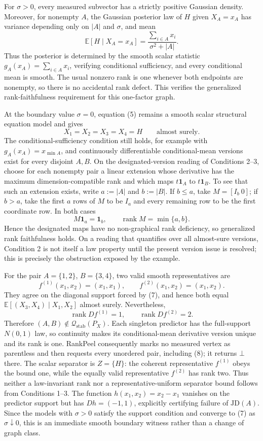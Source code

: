 For \(\sigma>0\), every measured subvector has a strictly positive Gaussian density.  Moreover, for nonempty \(A\), the Gaussian posterior law of \(H\) given \(X_A=x_A\) has variance depending only on \(|A|\) and \(\sigma\), and mean
\[
 \mathbb E[H\mid X_A=x_A]
 =\frac{\sum_{i\in A}x_i}{\sigma^2+|A|}. \tag{6}
\]
Thus the posterior is determined by the smooth scalar statistic \(g_A(x_A)=\sum_{i\in A}x_i\), verifying conditional sufficiency, and every conditional mean is smooth.  The usual nonzero rank is one whenever both endpoints are nonempty, so there is no accidental rank defect.  This verifies the generalized rank-faithfulness requirement for this one-factor graph.

At the boundary value \(\sigma=0\), equation (5) remains a smooth scalar structural equation model and gives
\[
 X_1=X_2=X_3=X_4=H\qquad\text{almost surely}. \tag{7}
\]
The conditional-sufficiency condition still holds, for example with \(g_A(x_A)=x_{\min A}\), and continuously differentiable conditional-mean versions exist for every disjoint \(A,B\).  On the designated-version reading of Conditions 2--3, choose for each nonempty pair a linear extension whose derivative has the maximum dimension-compatible rank and which maps \(t\mathbf 1_A\) to \(t\mathbf 1_B\).  To see that such an extension exists, write \(a:=|A|\) and \(b:=|B|\).  If \(b\leq a\), take \(M=[I_b\ 0]\); if \(b>a\), take the first \(a\) rows of \(M\) to be \(I_a\) and every remaining row to be the first coordinate row.  In both cases
\[
 M\mathbf 1_a=\mathbf 1_b,
 \qquad
 \operatorname{rank}M=\min\{a,b\}. \tag{7a}
\]
Hence the designated maps have no non-graphical rank deficiency, so generalized rank faithfulness holds.  On a reading that quantifies over all almost-sure versions, Condition 2 is not itself a law property until the present version issue is resolved; this is precisely the obstruction exposed by the example.

For the pair \(A=\{1,2\}\), \(B=\{3,4\}\), two valid smooth representatives are
\[
 f^{(1)}(x_1,x_2)=(x_1,x_1),
 \qquad
 f^{(2)}(x_1,x_2)=(x_1,x_2). \tag{8}
\]
They agree on the diagonal support forced by (7), and hence both equal \(\mathbb E[(X_3,X_4)\mid X_1,X_2]\) almost surely.  Nevertheless,
\[
 \operatorname{rank}Df^{(1)}=1,
 \qquad
 \operatorname{rank}Df^{(2)}=2. \tag{9}
\]
Therefore \((A,B)\notin\mathcal Q_{\mathrm{stab}}(P_X)\).  Each singleton predictor has the full-support \(N(0,1)\) law, so continuity makes its conditional-mean derivative version unique and its rank is one.  RankPeel consequently marks no measured vertex as parentless and then requests every unordered pair, including (8); it returns \(\bot\) there.  The scalar separator is \(Z=\{H\}\): the coherent representative \(f^{(1)}\) obeys the bound one, while the equally valid representative \(f^{(2)}\) has rank two.  Thus neither a law-invariant rank nor a representative-uniform separator bound follows from Conditions 1--3.  The function \(h(x_1,x_2)=x_2-x_1\) vanishes on the predictor support but has \(Dh=(-1,1)\), explicitly certifying failure of \(\mathrm{JD}(A)\).  Since the models with \(\sigma>0\) satisfy the support condition and converge to (7) as \(\sigma\downarrow0\), this is an immediate smooth boundary witness rather than a change of graph class.


